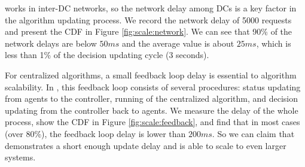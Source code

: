  \name works in inter-DC networks, so the network delay among DCs is a key factor in the algorithm updating process. We record the network delay of 5000 requests and present the CDF in Figure \ref{fig:scale:network}. We can see that 90\% of the network delays are below $50ms$ and the average value is about $25ms$, which is less than 1\% of the decision updating cycle (3 seconds).

 For centralized algorithms, a small feedback loop delay is essential to algorithm scalability. In \name, this feedback loop consists of several procedures: status updating from agents to the controller, running of the centralized algorithm, and decision updating from the controller back to agents. We measure the delay of the whole process, show the CDF in Figure \ref{fig:scale:feedback}, and find that in most cases (over 80\%), the feedback loop delay is lower than $200ms$. So we can claim that \name demonstrates a short enough update delay and is able to scale to even larger systems.

